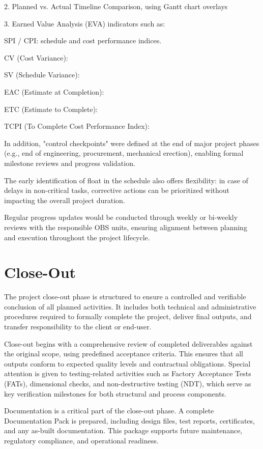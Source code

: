 \documentclass[12pt]{article}
\begin{document}
2.   Planned vs. Actual Timeline Comparison, using Gantt chart overlays

3.   Earned Value Analysis (EVA) indicators such as:

SPI / CPI: schedule and cost performance indices.

CV (Cost Variance):

SV (Schedule Variance):

EAC (Estimate at Completion):

ETC (Estimate to Complete):

TCPI (To Complete Cost Performance Index):

In addition, "control checkpoints" were defined at the end of major project phases (e.g., end of engineering, procurement, mechanical erection), enabling formal milestone reviews and progress validation.

The early identification of float in the schedule also offers flexibility: in case of delays in non-critical tasks, corrective actions can be prioritized without impacting the overall project duration.

Regular progress updates would be conducted through weekly or bi-weekly reviews with the responsible OBS units, ensuring alignment between planning and execution throughout the project lifecycle.

\section{Close-Out}

The project close-out phase is structured to ensure a controlled and verifiable conclusion of all planned activities. It includes both technical and administrative procedures required to formally complete the project, deliver final outputs, and transfer responsibility to the client or end-user.

Close-out begins with a comprehensive review of completed deliverables against the original scope, using predefined acceptance criteria. This ensures that all outputs conform to expected quality levels and contractual obligations. Special attention is given to testing-related activities such as Factory Acceptance Tests (FATs), dimensional checks, and non-destructive testing (NDT), which serve as key verification milestones for both structural and process components.

Documentation is a critical part of the close-out phase. A complete Documentation Pack is prepared, including design files, test reports, certificates, and any as-built documentation. This package supports future maintenance, regulatory compliance, and operational readiness.
\end{document}

